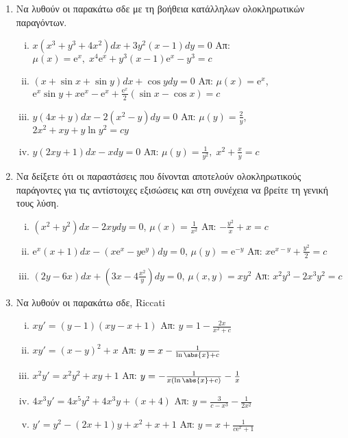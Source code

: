 \begin{enumerate}
\item Να λυθούν οι παρακάτω σδε με τη βοήθεια κατάλληλων ολοκληρωτικών παραγόντων.
	
  \begin{enumerate}[i)]
    \item $ x(x^{3}+y^{3}+4x^{2})dx+ 3y^{2}(x-1)dy=0 $ %
      \hfill Απ: $ \mu (x)= \mathrm{e}^{x}, \; x^{4} \mathrm{e}^{x} + y^{3}(x-1)
      \mathrm{e}^{x} - y^{3}=c $ 
    \item $ (x+ \sin{x} + \sin{y} )dx + \cos{y} dy=0 $ %
      \hfill Απ: $ \mu (x) = \mathrm{e}^{x} $, \; $ \mathrm{e}^{x} \sin{y} + x
      \mathrm{e}^{x} - \mathrm{e}^{x} + \frac{\mathrm{e}^{x}}{2} (\sin{x} - \cos{x})=c$
    \item $ y(4x+y)dx-2(x^{2}-y)dy=0 $ %
      \hfill Απ: $ \mu (y) = \frac{2}{y} $, \; $ 2x^{2}+xy+y \ln{y^{2}} = cy $  
    \item $ y(2xy+1)dx-xdy=0 $ %
      \hfill Απ: $ \mu (y) = \frac{1}{y^{2}}, \; x^{2} + \frac{x}{y} = c $ 
  \end{enumerate}

\item Να δείξετε ότι οι παραστάσεις που δίνονται αποτελούν ολοκληρωτικούς παράγοντες για
  τις αντίστοιχες εξισώσεις και στη συνέχεια να βρείτε τη γενική τους λύση.
  \begin{enumerate}[i)]
    \item $ (x^{2}+y^{2})dx - 2xydy = 0 $, \; $ \mu(x)= \frac{1}{x^{2}} $
      \hfill Απ: $ - \frac{y^{2}}{x} + x = c $
    \item $ \mathrm{e}^{x}(x+1)dx - (x \mathrm{e}^{x}-y \mathrm{e}^{y})dy = 0 $, \; 
      $ \mu(y) = \mathrm{e}^{-y} $
      \hfill Απ: $x \mathrm{e}^{x-y} + \frac{y^{2}}{2} = c $
    \item $ (2y-6x)dx+\left(3x-4\frac{x^{2}}{y}\right)dy=0 $, \; $ \mu (x,y) = xy^{2} $
      \hfill Απ: $ x^{2}y^{3}-2x^{3}y^{2}=c $ %
  \end{enumerate}

  \item Να λυθούν οι παρακάτω σδε, Riccati

    \begin{enumerate}[i)]
      \item $xy'=(y-1)(xy-x+1)$ \hfill Απ: $y=1-\frac{2x}{x^2+c}$
      \item $xy'=(x-y)^2+x$ \hfill Απ: $y=x-\frac{1}{\ln\abs{x}+c}$
      \item $x^2y'=x^2y^2+xy+1$ \hfill Απ: $y=-\frac{1}{x(\ln\abs{x}+c)}-\frac{1}{x}$
      \item $4x^3y'=4x^5y^2+4x^3y+(x+4)$ \hfill Απ: $y=\frac{3}{c-x^3}-\frac{1}{2x^2}$
      \item $y'=y^2-(2x+1)y+x^2+x+1$ \hfill Απ: $y=x+\frac{1}{c \mathrm{e}^x+1}$
    \end{enumerate}


\end{enumerate}
